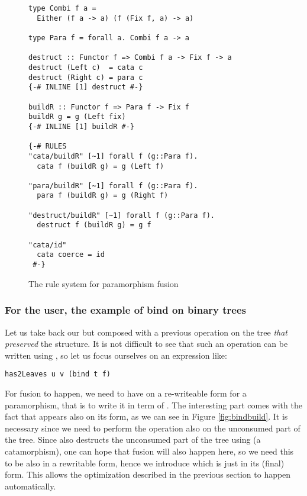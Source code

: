 \begin{figure}
\begin{verbatim}
type Combi f a =
  Either (f a -> a) (f (Fix f, a) -> a)

type Para f = forall a. Combi f a -> a

destruct :: Functor f => Combi f a -> Fix f -> a
destruct (Left c)  = cata c
destruct (Right c) = para c
{-# INLINE [1] destruct #-}

buildR :: Functor f => Para f -> Fix f
buildR g = g (Left fix)
{-# INLINE [1] buildR #-}

{-# RULES
"cata/buildR" [~1] forall f (g::Para f).
  cata f (buildR g) = g (Left f)

"para/buildR" [~1] forall f (g::Para f).
  para f (buildR g) = g (Right f)

"destruct/buildR" [~1] forall f (g::Para f).
  destruct f (buildR g) = g f

"cata/id"
  cata coerce = id
 #-}
\end{verbatim}
\caption{The rule system for paramorphism fusion}
\label{fig:para}
\end{figure}

\subsubsection{For the user, the example of bind on binary trees}
Let us take back our   but composed with a previous operation on the tree \emph{that preserved} the structure. It is not difficult to see that such an operation can be written using , so let us focus ourselves on an expression like:

\begin{verbatim}
has2Leaves u v (bind t f)
\end{verbatim}

\noindent For fusion to happen, we need to have  on a re-writeable form for a paramorphism, that is to write it in term of . The interesting part comes with the fact that  appears also on its  form, as we can see in Figure \ref{fig:bindbuild}. It is necessary since we need to perform the  operation also on the unconsumed part of the tree. Since  also destructs the unconsumed part of the tree using  (a catamorphism), one can hope that fusion will also happen here, so we need this  to be also in a rewritable form, hence we introduce  which is just  in its (final)  form. This allows the  optimization described in the previous section to happen automatically.

